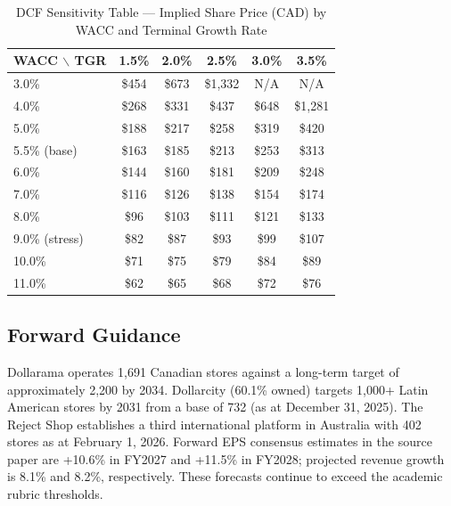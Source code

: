 \documentclass[11pt]{article}
\begin{document}
\begin{table}[H]
\centering
\caption{DCF Sensitivity Table --- Implied Share Price (CAD) by WACC and Terminal Growth Rate}
\small
\renewcommand{\arraystretch}{1.15}
\setlength{\tabcolsep}{5pt}
\begin{tabular}{lccccc}
\toprule
\rowcolor{tablegray}
WACC $\backslash$ TGR & 1.5\% & 2.0\% & 2.5\% & 3.0\% & 3.5\% \\
\midrule
3.0\% & \$454 & \$673 & \$1,332 & N/A & N/A \\
4.0\% & \$268 & \$331 & \$437 & \$648 & \$1,281 \\
5.0\% & \$188 & \$217 & \$258 & \$319 & \$420 \\
5.5\% (base) & \$163 & \$185 & \$213 & \$253 & \$313 \\
6.0\% & \$144 & \$160 & \$181 & \$209 & \$248 \\
7.0\% & \$116 & \$126 & \$138 & \$154 & \$174 \\
8.0\% & \$96 & \$103 & \$111 & \$121 & \$133 \\
9.0\% (stress) & \$82 & \$87 & \$93 & \$99 & \$107 \\
10.0\% & \$71 & \$75 & \$79 & \$84 & \$89 \\
11.0\% & \$62 & \$65 & \$68 & \$72 & \$76 \\
\bottomrule
\end{tabular}
\end{table}

\subsection{Forward Guidance}
Dollarama operates 1,691 Canadian stores against a long-term target of approximately 2,200 by 2034. Dollarcity (60.1\% owned) targets 1,000+ Latin American stores by 2031 from a base of 732 (as at December 31, 2025). The Reject Shop establishes a third international platform in Australia with 402 stores as at February 1, 2026. Forward EPS consensus estimates in the source paper are +10.6\% in FY2027 and +11.5\% in FY2028; projected revenue growth is 8.1\% and 8.2\%, respectively. These forecasts continue to exceed the academic rubric thresholds.
\end{document}
